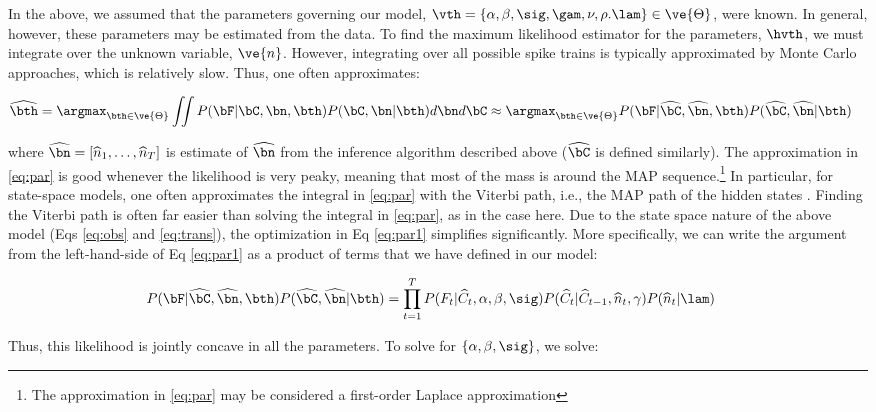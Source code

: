 \documentclass[12pt]{article}
\newcommand{\hC}{\widehat{C}}
\newcommand{\hn}{\widehat{n}}
\newcommand{\zT}{\ve{n}}
\newcommand{\hnm}{\widehat{\bn}}
\newcommand{\hCm}{\widehat{\bC}}
\begin{document}
In the above, we assumed that the parameters governing our model, $\vth=\{\alpha, \beta, \sig, \gam, \nu, \rho. \lam\} \in \ve{\Theta}$,  %
were known. In general, however, these parameters may be estimated from the data. To find the maximum likelihood estimator for the parameters, $\hvth$, we must integrate over the unknown variable, $\zT$. However, integrating over all possible spike trains is typically approximated by Monte Carlo approaches, which is relatively slow. Thus, one often approximates: %

\begin{align} \label{eq:par1}
\widehat{\bth} &= \argmax_{\bth \in \ve{\Theta}} \iint P(\bF|\bC, \bn, \bth) P(\bC, \bn | \bth) d\bn d\bC  \approx \argmax_{\bth \in \ve{\Theta}}P(\bF| \hCm, \hnm, \bth) P(\hCm, \hnm | \bth)
\end{align}

\noindent where $\hnm=[\hn_1, \ldots, \hn_T]$ is estimate of $\hnm$ from the inference algorithm described above ($\hCm$ is defined similarly). The approximation in \eqref{eq:par} is good whenever the likelihood is very peaky, meaning that most of the mass is around the MAP sequence.\footnote{The approximation in \eqref{eq:par} may be considered a first-order Laplace approximation}  In particular, for state-space models, one often approximates the integral in \eqref{eq:par} with the Viterbi path, i.e., the MAP path of the hidden states \cite{Rabiner89}. Finding the Viterbi path is often far easier than solving the integral in \eqref{eq:par}, as in the case here.  Due to the state space nature of the above model (Eqs \eqref{eq:obs} and \eqref{eq:trans}), the optimization in Eq \eqref{eq:par1} simplifies significantly.  More specifically, we can write the argument from the left-hand-side of Eq \eqref{eq:par1} as a product of terms that we have defined in our model:

 \begin{align} \label{eq:par2}
P(\bF| \hCm, \hnm, \bth) P(\hCm, \hnm | \bth) &= \prod_{t=1}^T P(F_t | \hC_t, \alpha, \beta,\sig) P(\hC_t | \hC_{t-1}, \hn_t, \gamma) P(\hn_t | \lam)
\end{align}

\noindent Thus, this likelihood is jointly concave in all the parameters.  To solve for $\{\alpha,\beta,\sig\}$, we solve:
\end{document}
